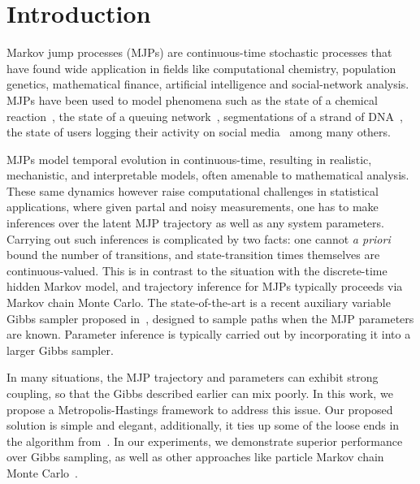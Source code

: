 \section{Introduction}
\label{sec:intro}
Markov jump processes (MJPs) are continuous-time stochastic processes that
have found wide application in fields like computational chemistry, 
population genetics, mathematical finance, artificial intelligence and
social-network analysis. MJPs have been used to model phenomena such 
as the state of a chemical reaction~\cite{gillespie97}, the state of a queuing 
network~\cite{Breuer2003}, segmentations of a strand of 
DNA~\cite{FearnSher2006}, the state of users logging their activity 
on social media~\cite{pan2016markov} among many others.

MJPs model temporal evolution in continuous-time, resulting in 
realistic, mechanistic, and interpretable models, often amenable to 
mathematical analysis. These same dynamics however raise computational
challenges in statistical applications, where given partal and noisy 
measurements, one has to make inferences over the latent MJP 
trajectory as well as any system parameters. Carrying out such
inferences is complicated by two facts: one cannot {\em a priori} 
bound the number of transitions, and state-transition times themselves
are continuous-valued. This is in contrast to the situation with
the discrete-time hidden Markov model, and trajectory inference for 
MJPs typically proceeds via Markov chain Monte Carlo. The 
state-of-the-art is a recent auxiliary variable Gibbs sampler proposed 
in~\cite{RaoTeh13},  designed to sample paths when the MJP parameters
are known. Parameter inference is typically carried out by 
incorporating it into a larger Gibbs sampler. 

In many situations, the MJP trajectory and parameters can exhibit 
strong coupling, so that the Gibbs described earlier can mix poorly.  
In this work, we propose a Metropolis-Hastings framework to address
this issue. Our proposed solution is simple and elegant, additionally,
it ties up some of the loose ends in the algorithm 
from~\cite{RaoTeh13}.  In our experiments, we demonstrate superior 
performance over Gibbs sampling, as well as other approaches like 
particle Markov chain Monte Carlo~\cite{Andrieu10}.

